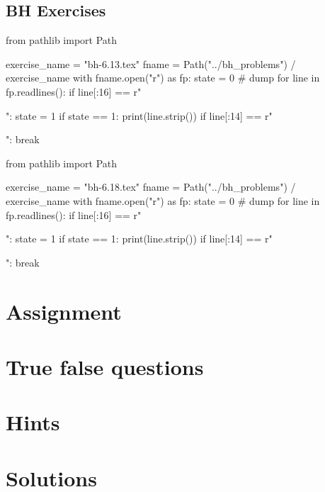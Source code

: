 \subsection{BH Exercises}
\label{sec:bh-exercises-1}


\begin{pycode}
from pathlib import Path

exercise_name = "bh-6.13.tex"
fname = Path("../bh_problems") / exercise_name
with fname.open("r") as fp:
    state = 0  # dump
    for line in fp.readlines():
        if line[:16] == r"\begin{exercise}":
            state = 1
        if state == 1:
            print(line.strip())
        if line[:14] == r"\end{exercise}":
            break
\end{pycode}

\begin{pycode}
from pathlib import Path

exercise_name = "bh-6.18.tex"
fname = Path("../bh_problems") / exercise_name
with fname.open("r") as fp:
    state = 0  # dump
    for line in fp.readlines():
        if line[:16] == r"\begin{exercise}":
            state = 1
        if state == 1:
            print(line.strip())
        if line[:14] == r"\end{exercise}":
            break
\end{pycode}



\section{Assignment}
\label{sec:assignment}

\setcounter{theorem}{0}

%


\section{True false questions}
\label{sec:true-false-questions}





\clearpage
\section{Hints}

\clearpage
\section{Solutions}



